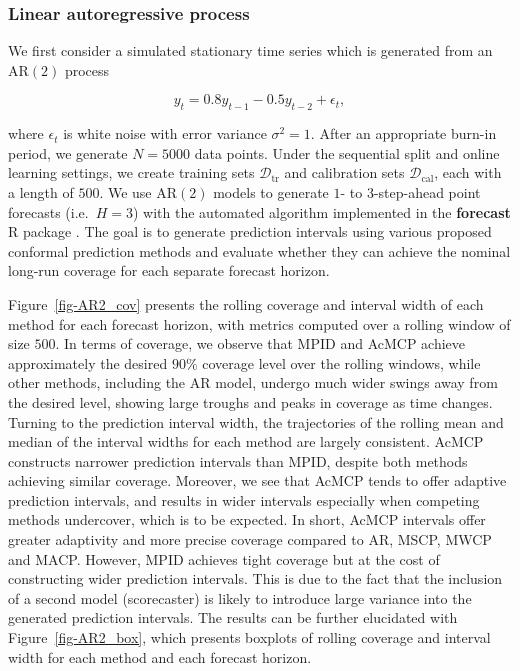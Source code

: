 \documentclass[
  11pt,
  a4paper,
]{article}
\theoremstyle{plain}
\theoremstyle{plain}
\theoremstyle{remark}
\begin{document}
\subsubsection{Linear autoregressive
process}\label{linear-autoregressive-process}

We first consider a simulated stationary time series which is generated
from an AR\((2)\) process

\[
y_t = 0.8y_{t-1} - 0.5y_{t-2} + \epsilon_t,
\]

where \(\epsilon_t\) is white noise with error variance
\(\sigma^2 = 1\). After an appropriate burn-in period, we generate
\(N=5000\) data points. Under the sequential split and online learning
settings, we create training sets \(\mathcal{D}_{\text{tr}}\) and
calibration sets \(\mathcal{D}_{\text{cal}}\), each with a length of
\(500\). We use AR\((2)\) models to generate \(1\)- to \(3\)-step-ahead
point forecasts (i.e.~\(H=3\)) with the automated algorithm implemented
in the \textbf{forecast} R package \autocite{hyndman2024}. The goal is
to generate prediction intervals using various proposed conformal
prediction methods and evaluate whether they can achieve the nominal
long-run coverage for each separate forecast horizon.

Figure~\ref{fig-AR2_cov} presents the rolling coverage and interval
width of each method for each forecast horizon, with metrics computed
over a rolling window of size \(500\). In terms of coverage, we observe
that MPID and AcMCP achieve approximately the desired \(90\%\) coverage
level over the rolling windows, while other methods, including the AR
model, undergo much wider swings away from the desired level, showing
large troughs and peaks in coverage as time changes. Turning to the
prediction interval width, the trajectories of the rolling mean and
median of the interval widths for each method are largely consistent.
AcMCP constructs narrower prediction intervals than MPID, despite both
methods achieving similar coverage. Moreover, we see that AcMCP tends to
offer adaptive prediction intervals, and results in wider intervals
especially when competing methods undercover, which is to be expected.
In short, AcMCP intervals offer greater adaptivity and more precise
coverage compared to AR, MSCP, MWCP and MACP. However, MPID achieves
tight coverage but at the cost of constructing wider prediction
intervals. This is due to the fact that the inclusion of a second model
(scorecaster) is likely to introduce large variance into the generated
prediction intervals. The results can be further elucidated with
Figure~\ref{fig-AR2_box}, which presents boxplots of rolling coverage
and interval width for each method and each forecast horizon.
\end{document}
